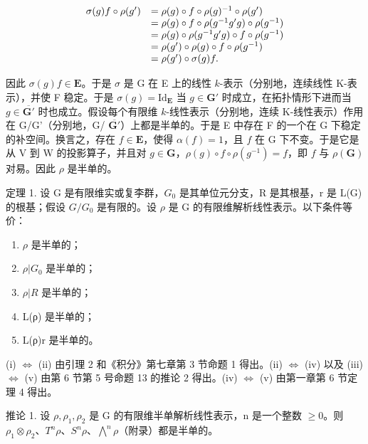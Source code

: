 \[
\begin{array}{r l} \sigma (g) f \circ \rho (g ^ {\prime}) & = \rho (g) \circ f \circ \rho (g) ^ {- 1} \circ \rho (g ^ {\prime}) \\ & = \rho (g) \circ f \circ \rho (g ^ {- 1} g ^ {\prime} g) \circ \rho (g ^ {- 1}) \\ & = \rho (g) \circ \rho (g ^ {- 1} g ^ {\prime} g) \circ f \circ \rho (g ^ {- 1}) \\ & = \rho (g ^ {\prime}) \circ \rho (g) \circ f \circ \rho (g ^ {- 1}) \\ & = \rho (g ^ {\prime}) \circ \sigma (g) f. \end{array}
\]

因此 \(\sigma(g)f\in\mathbf{E}\)。于是 \(\sigma\) 是 G 在 E 上的线性 \(k\)-表示（分别地，连续线性 K-表示），并使 F 稳定。于是 \(\sigma(g)=\mathrm{Id}_{\mathbf{E}}\) 当 \(g\in\mathbf{G}'\) 时成立，在拓扑情形下进而当 \(g\in\overline{\mathbf{G}'}\) 时也成立。假设每个有限维 \(k\)-线性表示（分别地，连续 K-线性表示）作用在 G/G'（分别地，G/ \(\overline{\mathbf{G}'}\)）上都是半单的。于是 E 中存在 F 的一个在 G 下稳定的补空间。换言之，存在 \(f\in\mathbf{E}\)，使得 \(\alpha(f)=1\)，且 \(f\) 在 G 下不变。于是它是从 V 到 W 的投影算子，并且对 \(g\in\mathbf{G}\)，\(\rho(g)\circ f\circ\rho(g^{-1})=f\)，即 \(f\) 与 \(\rho(\mathbf{G})\) 对易。因此 \(\rho\) 是半单的。

定理 1. 设 G 是有限维实或复李群，\(G_{0}\) 是其单位元分支，R 是其根基，r 是 L(G) 的根基；假设 \(G/G_{0}\) 是有限的。设 \(\rho\) 是 G 的有限维解析线性表示。以下条件等价：

\begin{enumerate}
\def\labelenumi{(\roman{enumi})}
\item
  \(\rho\) 是半单的；
\item
  \(\rho|G_{0}\) 是半单的；
\item
  \(\rho|R\) 是半单的；
\item
  L(ρ) 是半单的；
\item
  L(ρ)\textbar r 是半单的。
\end{enumerate}

(i) \(\Leftrightarrow\) (ii) 由引理 2 和《积分》第七章第 3 节命题 1 得出。(ii) \(\Leftrightarrow\) (iv) 以及 (iii) \(\Leftrightarrow\) (v) 由第 6 节第 5 号命题 13 的推论 2 得出。(iv) \(\Leftrightarrow\) (v) 由第一章第 6 节定理 4 得出。

推论 1. 设 \(\rho, \rho_{1}, \rho_{2}\) 是 G 的有限维半单解析线性表示，n 是一个整数 \(\geqslant 0\)。则 \(\rho_{1} \otimes \rho_{2}\)、\(T^{n}\rho\)、\(S^{n}\rho\)、\(\bigwedge^{n}\rho\)（附录）都是半单的。

